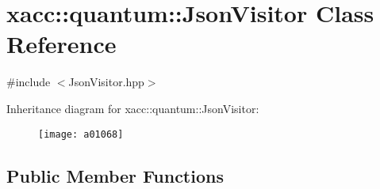 \hypertarget{a01068}{}\section{xacc\+:\+:quantum\+:\+:Json\+Visitor Class Reference}
\label{a01068}


{\ttfamily \#include $<$Json\+Visitor.\+hpp$>$}

Inheritance diagram for xacc\+:\+:quantum\+:\+:Json\+Visitor\+:\begin{figure}[H]
\begin{center}
\leavevmode
\texttt{[image: a01068]}
\end{center}
\end{figure}
\subsection*{Public Member Functions}
